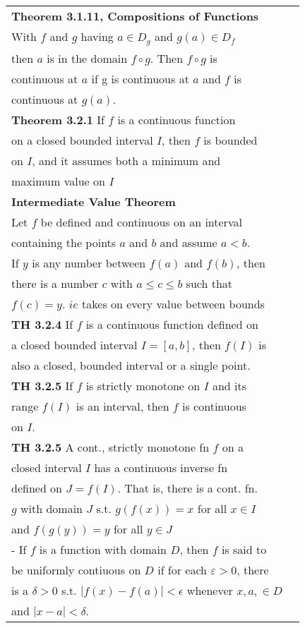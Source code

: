 \documentclass[10 pt,landscape]{article}
\begin{document}
\begin{multicols}{4}
\begin{tabular}{@{}ll@{}}
\end{tabular}


\begin{tabular}{@{}ll@{}}


\textbf{Theorem 3.1.11, Compositions of Functions}\\
With $f$ and $g$ having $a \in D_g$ and $g(a) \in D_f$ \\then $a$ is in the domain $f\circ g$. Then $f\circ g$ is\\ continuous at $a$ if g is continuous at $a$ and $f$ is\\ continuous at $g(a)$.\\
\textbf{Theorem 3.2.1} If $f$ is a continuous function\\ on a closed bounded interval $I$, then $f$ is bounded\\ on $I$, and it assumes both a minimum and\\ maximum value on $I$\\
\textbf{Intermediate Value Theorem}\\
Let $f$ be defined and continuous on an interval\\ containing the points $a$ and $b$ and assume $a<b$.\\ If $y$ is any number between $f(a)$ and $f(b)$, then \\ there is a number $c$ with $a\leq c \leq b$ such that \\ \:$f(c)=y$. $ie$ takes on every value between bounds\\
\textbf{TH 3.2.4} If $f$ is a continuous function defined on\\ a closed bounded interval $I=[a,b]$, then $f(I)$ is\\ also a closed, bounded interval or a single point.\\
\textbf{TH 3.2.5} If $f$ is strictly monotone on $I$ and its \\ range $f(I)$ is an interval, then $f$ is continuous \\on $I$.\\
\textbf{TH 3.2.5} A cont., strictly monotone fn $f$ on a \\closed interval $I$ has a continuous  inverse fn\\ defined on $J=f(I)$. That is, there is a cont. fn. \\ $g$ with domain $J$ s.t. $g(f(x))=x$ for all $x \in I$\\ and $f(g(y))=y$ for all $y \in J$\\
- If $f$ is a function with domain $D$, then $f$ is said to \\ be uniformly contiuous on $D$ if for each $\varepsilon >0$, there \\ is a $\delta >0$ s.t. $|f(x)-f(a)|< \epsilon$ whenever $x,a,\in D$ \\ and $|x-a|<\delta$.

\end{tabular}
\end{multicols}
\end{document}
